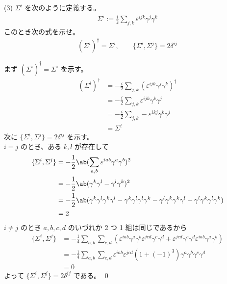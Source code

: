 \documentclass[uplatex,dvipdfmx,a4paper,11pt]{jlreq}
\makeatletter
\numberwithin{equation}{section}
\theoremstyle{definition}
\renewenvironment{proof}[1][\proofname]{\par
  \normalfont
  \topsep6\p@\@plus6\p@ \trivlist
  \item[\hskip\labelsep{\bfseries #1}\@addpunct{\bfseries}]\ignorespaces\quad\par
}{%
  \qed\endtrivlist\@endpefalse
}
\renewcommand\proofname{証明}
\makeatother
\begin{document}
(3) $\Sigma^i$ を次のように定義する。
\begin{align}
  \Sigma^i := \frac{i}{2}\sum_{j,k}\varepsilon^{ijk}\gamma^j\gamma^k
\end{align}
このとき次の式を示せ。
\begin{align}
  (\Sigma^i)^\dagger = \Sigma^i, \qquad \lbrace\Sigma^i, \Sigma^j\rbrace = 2\delta^{ij}
\end{align}
\begin{proof}
  まず $(\Sigma^i)^\dagger = \Sigma^i$ を示す。
  \begin{align}
    (\Sigma^i)^\dagger & = -\frac{i}{2}\sum_{j,k}(\varepsilon^{ijk}\gamma^j\gamma^k)^\dagger \\
                       & = -\frac{i}{2}\sum_{j,k}\varepsilon^{ijk}\gamma^k\gamma^j           \\
                       & = -\frac{i}{2}\sum_{j,k}-\varepsilon^{ikj}\gamma^k\gamma^j          \\
                       & = \Sigma^i
  \end{align}
  次に $\lbrace\Sigma^i, \Sigma^j\rbrace = 2\delta^{ij}$ を示す。 \\
  $i = j$ のとき、ある $k, l$ が存在して
  \begin{align}
    \lbrace\Sigma^i, \Sigma^j\rbrace & = -\frac{1}{2}\ab(\sum_{a,b}\varepsilon^{iab}\gamma^a\gamma^b)^2                                                                                             \\
                                     & = -\frac{1}{2}\ab(\gamma^k\gamma^l - \gamma^l\gamma^k)^2                                                                                                     \\
                                     & = -\frac{1}{2}\ab(\gamma^k\gamma^l\gamma^k\gamma^l - \gamma^k\gamma^l\gamma^l\gamma^k - \gamma^l\gamma^k\gamma^k\gamma^l + \gamma^l\gamma^k\gamma^l\gamma^k) \\
                                     & = 2
  \end{align}
  $i \neq j$ のとき $a, b, c, d$ のいづれか 2 つ 1 組は同じであるから
  \begin{align}
    \lbrace\Sigma^i, \Sigma^j\rbrace & = -\frac{1}{4}\sum_{a,b}\sum_{c,d}(\varepsilon^{iab}\gamma^a\gamma^b\varepsilon^{jcd}\gamma^c\gamma^d + \varepsilon^{jcd}\gamma^c\gamma^d\varepsilon^{iab}\gamma^a\gamma^b) \\
                                     & = -\frac{1}{4}\sum_{a,b}\sum_{c,d}\varepsilon^{iab}\varepsilon^{jcd}(1 + (-1)^3)\gamma^a\gamma^b\gamma^c\gamma^d                                                            \\
                                     & = 0
  \end{align}
  よって $\lbrace\Sigma^i, \Sigma^j\rbrace = 2\delta^{ij}$ である。
\end{proof}
\end{document}
